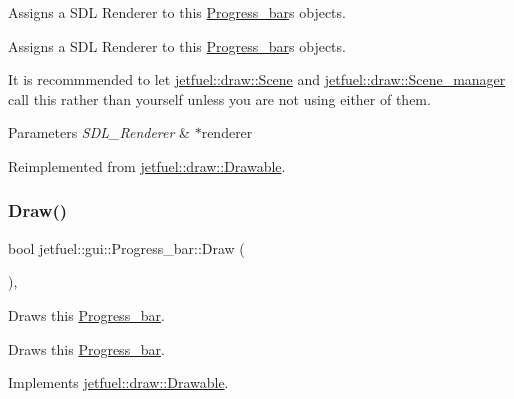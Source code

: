 Assigns a S\+DL Renderer to this \hyperlink{classjetfuel_1_1gui_1_1Progress__bar}{Progress\+\_\+bar}\textquotesingle{}s objects. 

Assigns a S\+DL Renderer to this \hyperlink{classjetfuel_1_1gui_1_1Progress__bar}{Progress\+\_\+bar}\textquotesingle{}s objects.

It is recommmended to let \hyperlink{classjetfuel_1_1draw_1_1Scene}{jetfuel\+::draw\+::\+Scene} and \hyperlink{classjetfuel_1_1draw_1_1Scene__manager}{jetfuel\+::draw\+::\+Scene\+\_\+manager} call this rather than yourself unless you are not using either of them.


\begin{DoxyParams}{Parameters}
{\em S\+D\+L\+\_\+\+Renderer} & $\ast$renderer \\
\hline
\end{DoxyParams}


Reimplemented from \hyperlink{classjetfuel_1_1draw_1_1Drawable_a0d7257f197d6ffcdd89c3a99c93d1400}{jetfuel\+::draw\+::\+Drawable}.

\mbox{\label{classjetfuel_1_1gui_1_1Progress__bar_a91a7ffe82738105be9b36a48dca1cdec}} 
\subsubsection{\texorpdfstring{Draw()}{Draw()}}
{\footnotesize\ttfamily bool jetfuel\+::gui\+::\+Progress\+\_\+bar\+::\+Draw (\begin{DoxyParamCaption}{ }\end{DoxyParamCaption})\hspace{0.3cm}{\ttfamily [override]}, {\ttfamily [virtual]}}



Draws this \hyperlink{classjetfuel_1_1gui_1_1Progress__bar}{Progress\+\_\+bar}. 

Draws this \hyperlink{classjetfuel_1_1gui_1_1Progress__bar}{Progress\+\_\+bar}. 

Implements \hyperlink{classjetfuel_1_1draw_1_1Drawable_a1a072070322965ce9411ee6e7c311c56}{jetfuel\+::draw\+::\+Drawable}.

\mbox{\label{classjetfuel_1_1gui_1_1Progress__bar_ad27c8ac735ad8698fce255b642cc6944}} 
